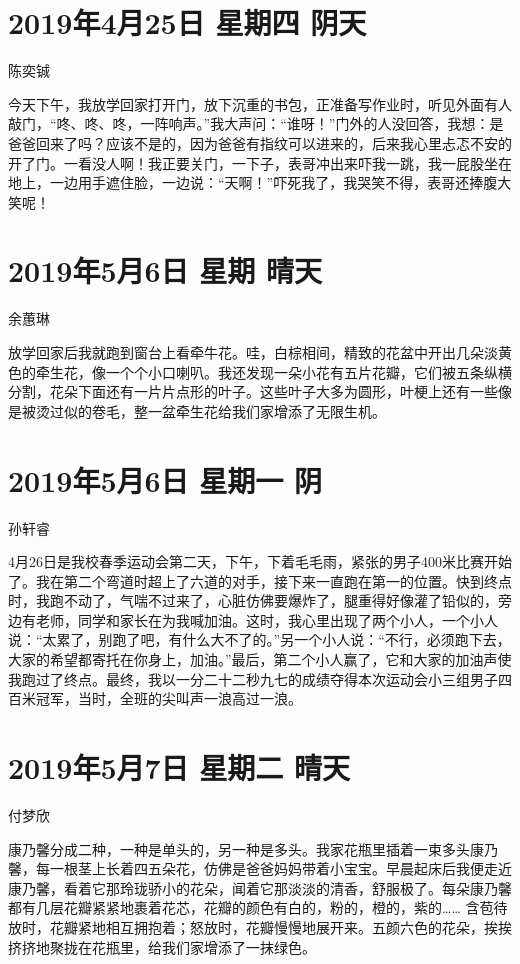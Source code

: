 \section{2019年4月25日 星期四 阴天}

陈奕铖

今天下午，我放学回家打开门，放下沉重的书包，正准备写作业时，听见外面有人敲门，“咚、咚、咚，一阵响声。”我大声问：“谁呀！”门外的人没回答，我想：是爸爸回来了吗？应该不是的，因为爸爸有指纹可以进来的，后来我心里忐忑不安的开了门。一看没人啊！我正要关门，一下子，表哥冲出来吓我一跳，我一屁股坐在地上，一边用手遮住脸，一边说：“天啊！”吓死我了，我哭笑不得，表哥还捧腹大笑呢！

\section{2019年5月6日 星期 晴天}

余蕙琳

放学回家后我就跑到窗台上看牵牛花。哇，白棕相间，精致的花盆中开出几朵淡黄色的牵生花，像一个个小口喇叭。我还发现一朵小花有五片花瓣，它们被五条纵横分割，花朵下面还有一片片点形的叶子。这些叶子大多为圆形，叶梗上还有一些像是被烫过似的卷毛，整一盆牵生花给我们家增添了无限生机。

\section{2019年5月6日 星期一 阴}

孙轩睿

4月26日是我校春季运动会第二天，下午，下着毛毛雨，紧张的男子400米比赛开始了。我在第二个弯道时超上了六道的对手，接下来一直跑在第一的位置。快到终点时，我跑不动了，气喘不过来了，心脏仿佛要爆炸了，腿重得好像灌了铅似的，旁边有老师，同学和家长在为我喊加油。这时，我心里出现了两个小人，一个小人说：“太累了，别跑了吧，有什么大不了的。”另一个小人说：“不行，必须跑下去，大家的希望都寄托在你身上，加油。”最后，第二个小人赢了，它和大家的加油声使我跑过了终点。最终，我以一分二十二秒九七的成绩夺得本次运动会小三组男子四百米冠军，当时，全班的尖叫声一浪高过一浪。

\section{2019年5月7日 星期二 晴天}

付梦欣

康乃馨分成二种，一种是单头的，另一种是多头。我家花瓶里插着一束多头康乃馨，每一根茎上长着四五朵花，仿佛是爸爸妈妈带着小宝宝。早晨起床后我便走近康乃馨，看着它那玲珑骄小的花朵，闻着它那淡淡的清香，舒服极了。每朵康乃馨都有几层花瓣紧紧地裹着花芯，花瓣的颜色有白的，粉的，橙的，紫的…… 含苞待放时，花瓣紧地相互拥抱着；怒放时，花瓣慢慢地展开来。五颜六色的花朵，挨挨挤挤地聚拢在花瓶里，给我们家增添了一抹绿色。


